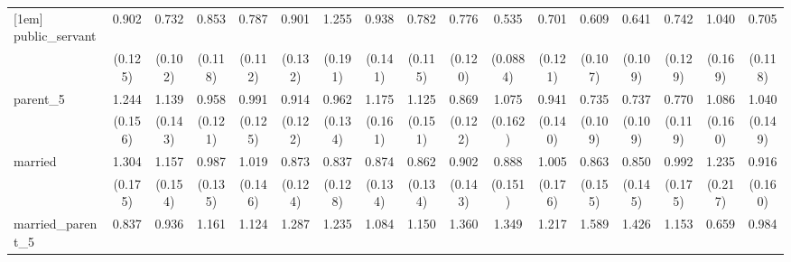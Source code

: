 {\begin{tabular}{l*{16}{c}}
[1em]
public\_servant      &       0.902         &       0.732\sym{*}  &       0.853         &       0.787         &       0.901         &       1.255         &       0.938         &       0.782         &       0.776         &       0.535\sym{***}&       0.701\sym{*}  &       0.609\sym{**} &       0.641\sym{**} &       0.742         &       1.040         &       0.705\sym{*}  \\
                    &     (0.125)         &     (0.102)         &     (0.118)         &     (0.112)         &     (0.132)         &     (0.191)         &     (0.141)         &     (0.115)         &     (0.120)         &    (0.0884)         &     (0.121)         &     (0.107)         &     (0.109)         &     (0.129)         &     (0.169)         &     (0.118)         \\
[1em]
parent\_5            &       1.244         &       1.139         &       0.958         &       0.991         &       0.914         &       0.962         &       1.175         &       1.125         &       0.869         &       1.075         &       0.941         &       0.735\sym{*}  &       0.737\sym{*}  &       0.770         &       1.086         &       1.040         \\
                    &     (0.156)         &     (0.143)         &     (0.121)         &     (0.125)         &     (0.122)         &     (0.134)         &     (0.161)         &     (0.151)         &     (0.122)         &     (0.162)         &     (0.140)         &     (0.109)         &     (0.109)         &     (0.119)         &     (0.160)         &     (0.149)         \\
[1em]
married             &       1.304\sym{*}  &       1.157         &       0.987         &       1.019         &       0.873         &       0.837         &       0.874         &       0.862         &       0.902         &       0.888         &       1.005         &       0.863         &       0.850         &       0.992         &       1.235         &       0.916         \\
                    &     (0.175)         &     (0.154)         &     (0.135)         &     (0.146)         &     (0.124)         &     (0.128)         &     (0.134)         &     (0.134)         &     (0.143)         &     (0.151)         &     (0.176)         &     (0.155)         &     (0.145)         &     (0.175)         &     (0.217)         &     (0.160)         \\
[1em]
married\_parent\_5    &       0.837         &       0.936         &       1.161         &       1.124         &       1.287         &       1.235         &       1.084         &       1.150         &       1.360         &       1.349         &       1.217         &       1.589\sym{*}  &       1.426         &       1.153         &       0.659         &       0.984         \\

\end{tabular}}
